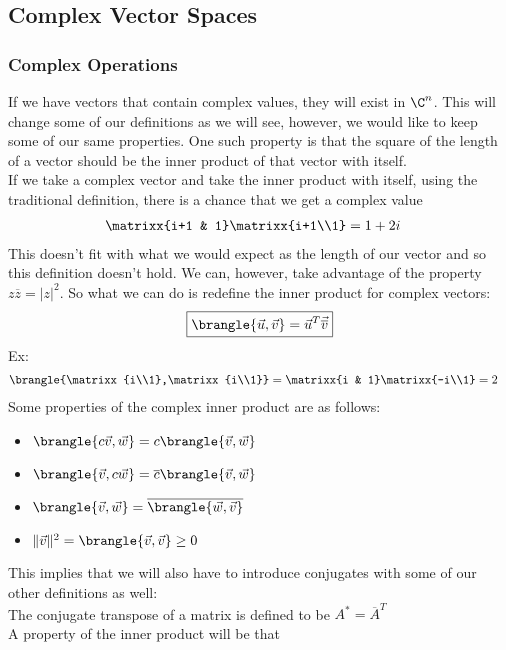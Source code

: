 \subsection{Complex Vector Spaces}
\subsubsection{Complex Operations}
If we have vectors that contain complex values, they will exist in $\C^n$. This will change some of our definitions as we will see, however, we would like to keep some of our same properties. One such property is that the square of the length of a vector should be the inner product of that vector with itself.\\
If we take a complex vector and take the inner product with itself, using the traditional definition, there is a chance that we get a complex value
\begin{align*}
    &\matrixx{i+1 & 1}\matrixx{i+1\\1}=1+2i
\end{align*}
This doesn't fit with what we would expect as the length of our vector and so this definition doesn't hold. We can, however, take advantage of the property $z\overline{z}=|z|^2$. So what we can do is redefine the inner product for complex vectors:
$$\boxed{\brangle{\vec{u},\vec{v}}=\vec{u}^T\vec{\overline{v}}}$$
Ex:
\begin{align*}
    &\brangle{\matrixx{i\\1},\matrixx{i\\1}}=\matrixx{i & 1}\matrixx{-i\\1}=2
\end{align*}
Some properties of the complex inner product are as follows:
\begin{itemize}
    \item $\brangle{c\vec{v},\vec{w}}=c\brangle{\vec{v},\vec{w}}$
    \item $\brangle{\vec{v},c\vec{w}}=\overline{c}\brangle{\vec{v},\vec{w}}$
    \item $\brangle{\vec{v},\vec{w}}=\overline{\brangle{\vec{w},\vec{v}}}$
    \item $\|\vec{v}\|^2=\brangle{\vec{v},\vec{v}}\geq0$
\end{itemize}
This implies that we will also have to introduce conjugates with some of our other definitions as well:\\
The conjugate transpose of a matrix is defined to be $A^*=\overline{A}^T$\\
A property of the inner product will be that
